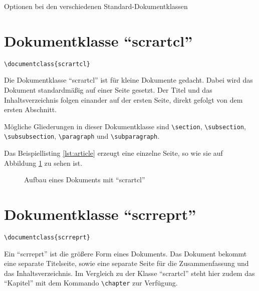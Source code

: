\begin{table}[htbp]
	\caption{Optionen bei den verschiedenen Standard-Dokumentklassen}
	\label{tab:classoptions}
\end{table}

\section{Dokumentklasse \enquote{scrartcl}}

\begin{lstlisting}
\documentclass{scrartcl}
\end{lstlisting}

Die Dokumentklasse \enquote{scrartcl} ist für kleine Dokumente gedacht. Dabei wird das Dokument standardmäßig auf einer Seite gesetzt. Der Titel und das Inhaltsverzeichnis folgen einander auf der ersten Seite, direkt gefolgt von dem ersten Abschnitt.

Mögliche Gliederungen in dieser Dokumentklasse sind \texttt{\textbackslash section}, \texttt{\textbackslash subsection},
\\
\texttt{\textbackslash subsubsection}, \texttt{\textbackslash paragraph} und \texttt{\textbackslash subparagraph}.

Das Beispiellisting \ref{lst:article} erzeugt eine einzelne Seite, so wie sie auf Abbildung \ref{fig:article} zu sehen ist.

\begin{figure}[htb]
	\begin{center}
	\end{center}
	\caption{Aufbau eines Dokuments mit \enquote{scrartcl}}
	\label{fig:article}
\end{figure}

\section{Dokumentklasse \enquote{scrreprt}}

\begin{lstlisting}
\documentclass{scrreprt}
\end{lstlisting}

Ein \enquote{scrreprt} ist die größere Form eines Dokuments. Das Dokument bekommt eine separate Titelseite, sowie eine separate Seite für die Zusammenfassung und das Inhaltsverzeichnis. Im Vergleich zu der Klasse \enquote{scrartcl} steht hier zudem das \enquote{Kapitel} mit dem Kommando \texttt{\textbackslash chapter} zur Verfügung.

